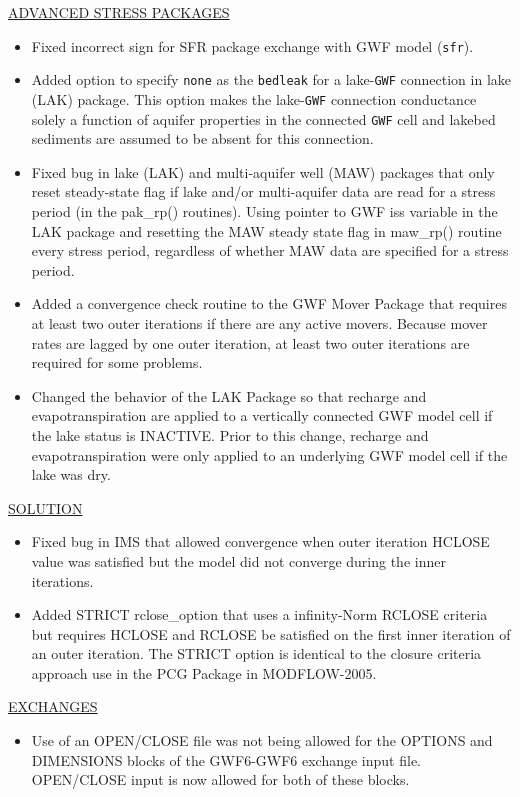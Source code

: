 \documentclass[11pt,twoside,twocolumn]{usgsreport}
\begin{document}
\begin{itemize}
\underline{ADVANCED STRESS PACKAGES}
\begin{itemize}
\item Fixed incorrect sign for SFR package exchange with GWF model (\texttt{sfr}).
\item Added option to specify \texttt{none} as the \texttt{bedleak} for a lake-\texttt{GWF} connection in lake (LAK) package. This option makes the lake-\texttt{GWF} connection conductance solely a function of aquifer properties in the connected \texttt{GWF} cell and lakebed sediments are assumed to be absent for this connection.
\item Fixed bug in lake (LAK) and multi-aquifer well (MAW) packages that only reset steady-state flag if lake and/or multi-aquifer data are read for a stress period (in the pak\_rp() routines). Using pointer to GWF iss variable in the LAK package and resetting the MAW steady state flag in maw\_rp() routine every stress period, regardless of whether MAW data are specified for a stress period.
\item Added a convergence check routine to the GWF Mover Package that requires at least two outer iterations if there are any active movers.  Because mover rates are lagged by one outer iteration, at least two outer iterations are required for some problems.
\item Changed the behavior of the LAK Package so that recharge and evapotranspiration are applied to a vertically connected GWF model cell if the lake status is INACTIVE.  Prior to this change, recharge and evapotranspiration were only applied to an underlying GWF model cell if the lake was dry.
\end{itemize}

\underline{SOLUTION}
\begin{itemize}
\item Fixed bug in IMS that allowed convergence when outer iteration HCLOSE value was satisfied but the model did not converge during the inner iterations.
\item Added STRICT rclose\_option that uses a infinity-Norm RCLOSE criteria but requires HCLOSE and RCLOSE be satisfied on the first inner iteration of an outer iteration. The STRICT option is identical to the closure criteria approach use in the PCG Package in MODFLOW-2005.
\end{itemize}

\underline{EXCHANGES}
\begin{itemize}
\item Use of an OPEN/CLOSE file was not being allowed for the OPTIONS and DIMENSIONS blocks of the GWF6-GWF6 exchange input file.  OPEN/CLOSE input is now allowed for both of these blocks.
\end{itemize}


\end{itemize}
\end{document}
